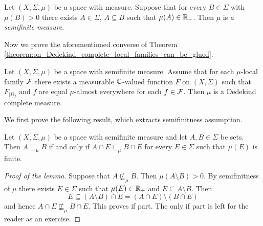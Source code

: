 \begin{definition}
  Let $(X,\Sigma,\mu)$ be a space with measure. Suppose that for every $B \in \Sigma$ with $\mu(B) > 0$ there exists $A \in \Sigma$, $A\subseteq B$ such that $\mu(A) \in {\mathbb R}_+$. Then $\mu$ is \textit{a semifinite measure}. 
\end{definition}
\noindent
Now we prove the aforementioned converse of Theorem \ref{theorem:on_Dedekind_complete_local_families_can_be_glued}.

\begin{theorem}
  Let $(X,\Sigma,\mu)$ be a space with semifinite measure. Assume that for each $\mu$-local family ${\mathcal F}$ there exists a measurable ${\mathbb C}$-valued function $F$ on $(X,\Sigma)$ such that $F_{\mid D_f}$ and $f$ are equal $\mu$-almost everywhere for each $f \in {\mathcal F}$. Then $\mu$ is a Dedekind complete measure.
\end{theorem}
\noindent
We first prove the following result, which extracts semifinitness assumption.

\begin{lemma}\label{lemma:for_semifinite_essential_containment_is_determined_by_finite_measure_sets}
  Let $(X,\Sigma,\mu)$ be a space with semifinite measure and let $A,B\in \Sigma$ be sets. Then $A \sqsubseteq_{\mu} B$ if and only if $A\cap E \sqsubseteq_{\mu} B\cap E$ for every $E \in \Sigma$ such that $\mu(E)$ is finite.
\end{lemma}
\begin{proof}[Proof of the lemma]
  Suppose that $A \not \sqsubseteq_{\mu} B$. Then $\mu(A\setminus B) > 0$. By semifinitness of $\mu$ there exists $E \in \Sigma$ such that $\mu(E) \in {\mathbb R}_+$ and $E \subseteq A\setminus B$. Then 
  $$E \subseteq \left(A\setminus B\right) \cap E = \left(A\cap E\right)\setminus \left(B\cap E\right)$$
  and hence $A\cap E \not \sqsubseteq_{\mu} B\cap E$. This proves if part. The only if part is left for the reader as an exercise.
\end{proof}

